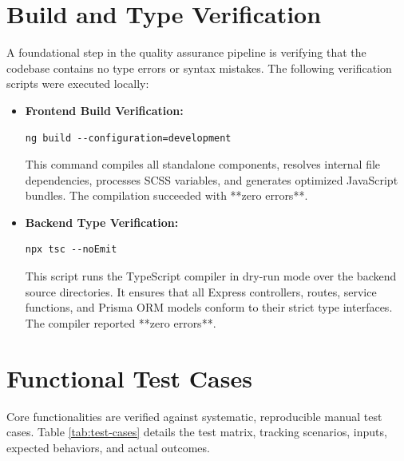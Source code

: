 \section{Build and Type Verification}
A foundational step in the quality assurance pipeline is verifying that the codebase contains no type errors or syntax mistakes. The following verification scripts were executed locally:
\begin{itemize}
    \item \textbf{Frontend Build Verification:}
    \begin{lstlisting}
ng build --configuration=development
    \end{lstlisting}
    This command compiles all standalone components, resolves internal file dependencies, processes SCSS variables, and generates optimized JavaScript bundles. The compilation succeeded with **zero errors**.
    
    \item \textbf{Backend Type Verification:}
    \begin{lstlisting}
npx tsc --noEmit
    \end{lstlisting}
    This script runs the TypeScript compiler in dry-run mode over the backend source directories. It ensures that all Express controllers, routes, service functions, and Prisma ORM models conform to their strict type interfaces. The compiler reported **zero errors**.
\end{itemize}

\section{Functional Test Cases}
Core functionalities are verified against systematic, reproducible manual test cases. Table \ref{tab:test-cases} details the test matrix, tracking scenarios, inputs, expected behaviors, and actual outcomes.

